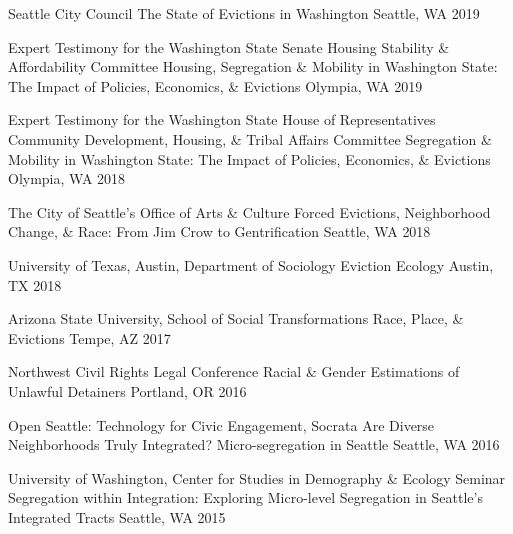 \begin{cventries}
  \cventry
    {Seattle City Council} %
    {The State of Evictions in Washington} %
    {Seattle, WA} %
    {2019} %
    {}

  \cventry
    {Expert Testimony for the Washington State Senate Housing Stability \& Affordability Committee} %
    {Housing, Segregation \& Mobility in Washington State: The Impact of Policies, Economics, \& Evictions} %
    {Olympia, WA} %
    {2019} %
    {}

  \cventry
    {Expert Testimony for the Washington State House of Representatives Community Development, Housing, \& Tribal Affairs Committee} %
    {Segregation \& Mobility in Washington State: The Impact of Policies, Economics, \& Evictions} %
    {Olympia, WA} %
    {2018} %
    {}

  \cventry
    {The City of Seattle’s Office of Arts \& Culture} %
    {Forced Evictions, Neighborhood Change, \& Race: From Jim Crow to Gentrification} %
    {Seattle, WA} %
    {2018} %
    {}

  \cventry
    {University of Texas, Austin, Department of Sociology} %
    {Eviction Ecology} %
    {Austin, TX} %
    {2018} %
    {}

  \cventry
    {Arizona State University, School of Social Transformations} %
    {Race, Place, \& Evictions} %
    {Tempe, AZ} %
    {2017} %
    {}

  \cventry
    {Northwest Civil Rights Legal Conference} %
    {Racial \& Gender Estimations of Unlawful Detainers} %
    {Portland, OR} %
    {2016} %
    {}
    
  \cventry
    {Open Seattle: Technology for Civic Engagement, Socrata} %
    {Are Diverse Neighborhoods Truly Integrated? Micro-segregation in Seattle} %
    {Seattle, WA} %
    {2016} %
    {}
    
  \cventry
    {University of Washington, Center for Studies in Demography \& Ecology Seminar} %
    {Segregation within Integration: Exploring Micro-level Segregation in Seattle's Integrated Tracts} %
    {Seattle, WA} %
    {2015} %
    {}
    

\end{cventries}
